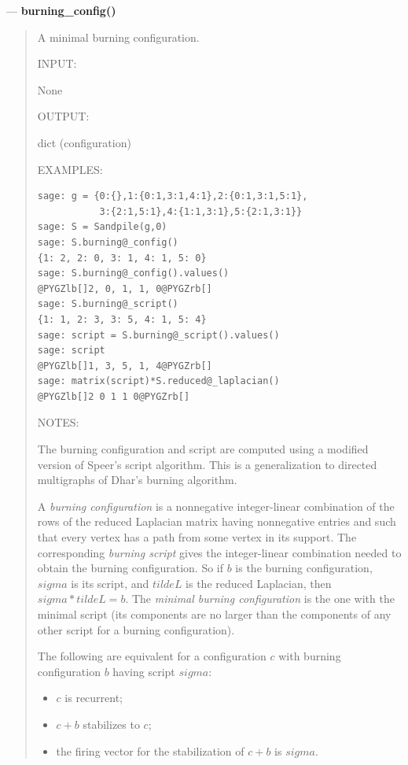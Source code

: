 \documentclass[letterpaper,10pt,english]{manual}
\begin{document}
---
\hypertarget{burning-config}{}
\textbf{burning\_config()}
\begin{quote}

A minimal burning configuration.

INPUT:

None

OUTPUT:

dict (configuration)

EXAMPLES:

\begin{Verbatim}[commandchars=@\[\]]
sage: g = {0:{},1:{0:1,3:1,4:1},2:{0:1,3:1,5:1},
           3:{2:1,5:1},4:{1:1,3:1},5:{2:1,3:1}}
sage: S = Sandpile(g,0)
sage: S.burning@_config()
{1: 2, 2: 0, 3: 1, 4: 1, 5: 0}
sage: S.burning@_config().values()
@PYGZlb[]2, 0, 1, 1, 0@PYGZrb[]
sage: S.burning@_script()
{1: 1, 2: 3, 3: 5, 4: 1, 5: 4}
sage: script = S.burning@_script().values()
sage: script
@PYGZlb[]1, 3, 5, 1, 4@PYGZrb[]
sage: matrix(script)*S.reduced@_laplacian()
@PYGZlb[]2 0 1 1 0@PYGZrb[]
\end{Verbatim}

NOTES:

The burning configuration and script are computed using a modified
version of Speer's script algorithm.  This is a generalization to
directed multigraphs of Dhar's burning algorithm.

A \emph{burning configuration} is a nonnegative integer-linear
combination of the rows of the reduced Laplacian matrix having
nonnegative entries and such that every vertex has a path from some
vertex in its support.  The corresponding \emph{burning script} gives
the integer-linear combination needed to obtain the burning
configuration.  So if $b$ is the burning configuration, $sigma$ is its
script, and $tilde{L}$ is the reduced Laplacian, then $sigma *
tilde{L} = b$.  The \emph{minimal burning configuration} is the one
with the minimal script (its components are no larger than the
components of any other script
for a burning configuration).

The following are equivalent for a configuration $c$ with burning
configuration $b$ having script $sigma$:
\begin{itemize}
\item {} 
$c$ is recurrent;

\item {} 
$c+b$ stabilizes to $c$;

\item {} 
the firing vector for the stabilization of $c+b$ is $sigma$.

\end{itemize}
\end{quote}
\end{document}
